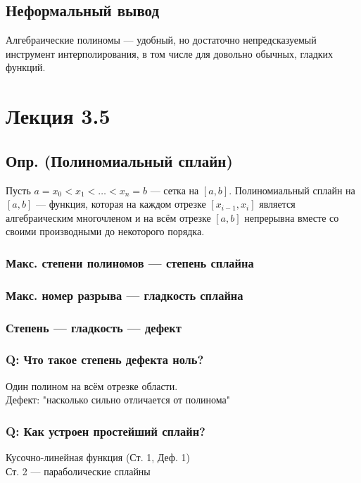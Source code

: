 \subsection*{Неформальный вывод}
Алгебраические полиномы --- удобный, но достаточно непредсказуемый инструмент интерполирования, в том числе для довольно обычных, гладких функций.

\section*{Лекция 3.5}

\subsection*{Опр. (Полиномиальный сплайн)}
Пусть $a = x_0 < x_1 < \ldots < x_n = b$ — сетка на $[a, b]$. Полиномиальный сплайн на $[a, b]$ --- функция, которая на каждом отрезке $[x_{i-1}, x_i]$ является алгебраическим многочленом и на всём отрезке $[a, b]$ непрерывна вместе со своими производными до некоторого порядка.

\subsubsection*{Макс. степени полиномов --- степень сплайна}

\subsubsection*{Макс. номер разрыва --- гладкость сплайна}

\subsubsection*{Степень --- гладкость --- дефект}

\subsubsection*{Q: Что такое степень дефекта ноль?}
Один полином на всём отрезке области. \\
Дефект: "насколько сильно отличается от полинома"

\subsubsection*{Q: Как устроен простейший сплайн?}
Кусочно-линейная функция (Ст. 1, Деф. 1) \\
Ст. 2 --- параболические сплайны

